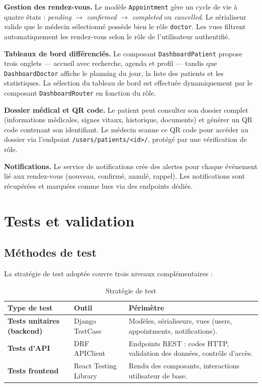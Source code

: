 \documentclass[12pt, a4paper]{article}
\begin{document}
\textbf{Gestion des rendez-vous.} Le modèle \texttt{Appointment} gère un cycle de vie à quatre états : \textit{pending} $\rightarrow$ \textit{confirmed} $\rightarrow$ \textit{completed} ou \textit{cancelled}. Le sérialiseur valide que le médecin sélectionné possède bien le rôle \texttt{doctor}. Les vues filtrent automatiquement les rendez-vous selon le rôle de l'utilisateur authentifié.

\textbf{Tableaux de bord différenciés.} Le composant \texttt{DashboardPatient} propose trois onglets — accueil avec recherche, agenda et profil — tandis que \texttt{DashboardDoctor} affiche le planning du jour, la liste des patients et les statistiques. La sélection du tableau de bord est effectuée dynamiquement par le composant \texttt{DashboardRouter} en fonction du rôle.

\textbf{Dossier médical et QR code.} Le patient peut consulter son dossier complet (informations médicales, signes vitaux, historique, documents) et générer un QR code contenant son identifiant. Le médecin scanne ce QR code pour accéder au dossier via l'endpoint \texttt{/users/patients/<id>/}, protégé par une vérification de rôle.

\textbf{Notifications.} Le service de notifications crée des alertes pour chaque événement lié aux rendez-vous (nouveau, confirmé, annulé, rappel). Les notifications sont récupérées et marquées comme lues via des endpoints dédiés.

\section{Tests et validation}

\subsection{Méthodes de test}

La stratégie de test adoptée couvre trois niveaux complémentaires :

\begin{table}[h!]
\centering
\caption{Stratégie de test}
\label{tab:tests}
\small
\begin{tabular}{>{\bfseries}p{3.5cm} p{3cm} p{6.5cm}}
\toprule
Type de test & Outil & Périmètre \\
\midrule
Tests unitaires (backend) & Django TestCase & Modèles, sérialiseurs, vues (users, appointments, notifications). \\
Tests d'API & DRF APIClient & Endpoints REST : codes HTTP, validation des données, contrôle d'accès. \\
Tests frontend & React Testing Library & Rendu des composants, interactions utilisateur de base. \\
\bottomrule
\end{tabular}
\end{table}
\end{document}
